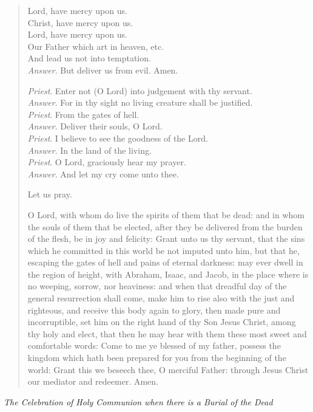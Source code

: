 \documentclass[
]{book}
\begin{document}
\begin{quote}
Lord, have mercy upon us.\\
Christ, have mercy upon us.\\
Lord, have mercy upon us.\\
Our Father which art in heaven, etc.\\
And lead us not into temptation.\\
\emph{Answer}. But deliver us from evil. Amen.

\emph{Priest}. Enter not (O Lord) into judgement with thy servant.\\
\emph{Answer}. For in thy sight no living creature shall be justified.\\
\emph{Priest}. From the gates of hell.\\
\emph{Answer}. Deliver their souls, O Lord.\\
\emph{Priest}. I believe to see the goodness of the Lord.\\
\emph{Answer}. In the land of the living.\\
\emph{Priest}. O Lord, graciously hear my prayer.\\
\emph{Answer}. And let my cry come unto thee.

Let us pray.

O Lord, with whom do live the spirits of them that be dead: and in whom the souls of them that be elected, after they be delivered from the burden of the flesh, be in joy and felicity: Grant unto us thy servant, that the sins which he committed in this world be not imputed unto him, but that he, escaping the gates of hell and pains of eternal darkness: may ever dwell in the region of height, with Abraham, Isaac, and Jacob, in the place where is no weeping, sorrow, nor heaviness: and when that dreadful day of the general resurrection shall come, make him to rise also with the just and righteous, and receive this body again to glory, then made pure and incorruptible, set him on the right hand of thy Son Jesus Christ, among thy holy and elect, that then he may hear with them these most sweet and comfortable words: Come to me ye blessed of my father, possess the kingdom which hath been prepared for you from the beginning of the world: Grant this we beseech thee, O merciful Father: through Jesus Christ our mediator and redeemer. Amen.
\end{quote}

\emph{The Celebration of Holy Communion when there is a Burial of the Dead}
\end{document}
